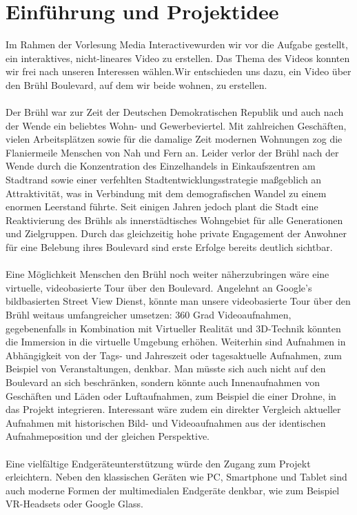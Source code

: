 \chapter{Einführung und Projektidee}
Im Rahmen der Vorlesung \glqq Media Interactive\grqq wurden wir vor die Aufgabe gestellt, ein interaktives, nicht-lineares Video zu erstellen. Das Thema des Videos konnten wir frei nach unseren Interessen wählen.Wir entschieden uns dazu, ein Video über den Brühl Boulevard, auf dem wir beide wohnen, zu erstellen.
\\ \\
Der Brühl war zur Zeit der Deutschen Demokratischen Republik und auch nach der Wende ein beliebtes Wohn- und Gewerbeviertel. Mit zahlreichen Geschäften, vielen Arbeitsplätzen sowie für die damalige Zeit modernen Wohnungen zog die Flaniermeile Menschen von Nah und Fern an. Leider verlor der Brühl nach der Wende durch die Konzentration des Einzelhandels in Einkaufszentren am Stadtrand sowie einer verfehlten Stadtentwicklungsstrategie maßgeblich an Attraktivität, was in Verbindung mit dem demografischen Wandel zu einem enormen Leerstand führte. Seit einigen Jahren jedoch plant die Stadt eine Reaktivierung des Brühls als innerstädtisches Wohngebiet für alle Generationen und Zielgruppen. Durch das gleichzeitig hohe private Engagement der Anwohner für eine Belebung ihres Boulevard sind erste Erfolge bereits deutlich sichtbar.
\\ \\
Eine Möglichkeit Menschen den Brühl noch weiter näherzubringen wäre eine virtuelle, videobasierte Tour über den Boulevard. Angelehnt an Google's bildbasierten Street View Dienst, könnte man unsere videobasierte Tour über den Brühl weitaus umfangreicher umsetzen: 360 Grad Videoaufnahmen, gegebenenfalls in Kombination mit Virtueller Realität und 3D-Technik könnten die Immersion in die virtuelle Umgebung erhöhen. Weiterhin sind Aufnahmen in Abhängigkeit von der Tags- und Jahreszeit oder tagesaktuelle Aufnahmen, zum Beispiel von Veranstaltungen, denkbar. Man müsste sich auch nicht auf den Boulevard an sich beschränken, sondern könnte auch Innenaufnahmen von Geschäften und Läden oder Luftaufnahmen, zum Beispiel die einer Drohne, in das Projekt integrieren. Interessant wäre zudem ein direkter Vergleich aktueller Aufnahmen mit historischen Bild- und Videoaufnahmen aus der identischen Aufnahmeposition und der gleichen Perspektive.
\\ \\
 Eine vielfältige Endgeräteunterstützung würde den Zugang zum Projekt erleichtern. Neben den klassischen Geräten wie PC, Smartphone und Tablet sind auch moderne Formen der multimedialen Endgeräte denkbar, wie zum Beispiel VR-Headsets oder Google Glass.



